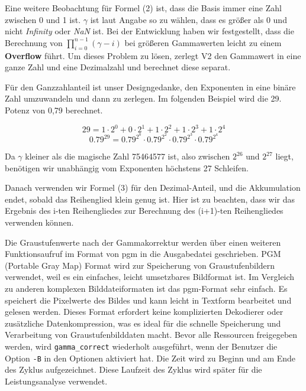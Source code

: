 \documentclass[course=erap]{aspdoc}
\begin{document}
\par
Eine weitere Beobachtung für Formel (2) ist, dass die Basis immer eine Zahl zwischen 0 und 1 ist. {$\gamma$} ist laut Angabe so zu wählen, dass es größer als 0 und nicht \emph{Infinity} oder \emph{NaN} ist. Bei der Entwicklung haben wir festgestellt, dass die Berechnung von \(\prod_{i=0}^{n-1} (\gamma-i)\) bei größeren Gammawerten leicht zu einem \textbf{Overflow} führt. Um dieses Problem zu lösen, zerlegt V2 den Gammawert in eine ganze Zahl und eine Dezimalzahl und berechnet diese separat.

\par
Für den Ganzzahlanteil ist unser Designgedanke, den Exponenten in eine binäre Zahl umzuwandeln und dann zu zerlegen. Im folgenden Beispiel wird die 29. Potenz von 0,79 berechnet.

\[
29 = 1 \cdot 2^0 + 0 \cdot 2^1 + 1 \cdot 2^2 + 1 \cdot 2^3 + 1 \cdot 2^4
\]
\[
0.79^{29} = 0.79^{2^0} \cdot 0.79^{2^2} \cdot 0.79^{2^3} \cdot 0.79^{2^4}
\]

\par
Da $\gamma$ kleiner als die magische Zahl 75464577 ist, also zwischen $2^{26}$ und $2^{27}$ liegt, benötigen wir unabhängig vom Exponenten höchstens 27 Schleifen.

\par
Danach verwenden wir Formel (3) für den Dezimal-Anteil, und die Akkumulation endet, sobald das Reihenglied klein genug ist. Hier ist zu beachten, dass wir das Ergebnis des i-ten Reihengliedes zur Berechnung des (i+1)-ten Reihengliedes verwenden können.

\par
Die Graustufenwerte nach der Gammakorrektur werden über einen weiteren Funktionsaufruf im Format von pgm in die Ausgabedatei geschrieben. PGM (Portable Gray Map) Format \cite{netpbm} wird zur Speicherung von Graustufenbildern verwendet, weil es ein einfaches, leicht umsetzbares Bildformat ist. Im Vergleich zu anderen komplexen Bilddateiformaten ist das pgm-Format sehr einfach. Es speichert die Pixelwerte des Bildes und kann leicht in Textform bearbeitet und gelesen werden. Dieses Format erfordert keine komplizierten Dekodierer oder zusätzliche Datenkompression, was es ideal für die schnelle Speicherung und Verarbeitung von Graustufenbilddaten macht. Bevor alle Ressourcen freigegeben werden, wird \texttt{gamma\_correct} wiederholt ausgeführt, wenn der Benutzer die Option \texttt{-B} in den Optionen aktiviert hat. Die Zeit wird zu Beginn und am Ende des Zyklus aufgezeichnet. Diese Laufzeit des Zyklus wird später für die Leistungsanalyse verwendet.
\end{document}
